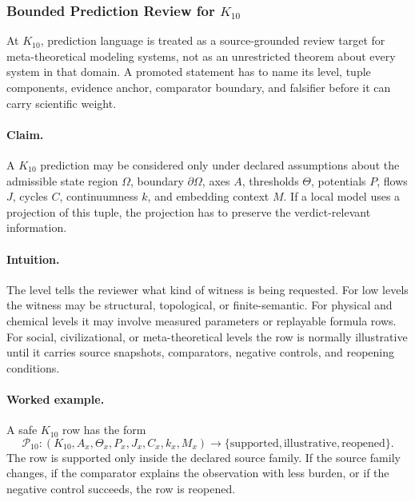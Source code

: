 \subsubsection{Bounded Prediction Review for \texorpdfstring{$K_10$}{K_10}}
\label{sec:predictions-k10-r014}

At \(K_10\), prediction language is treated as a source-grounded review
target for meta-theoretical modeling systems, not as an unrestricted theorem about every system in that
domain. A promoted statement has to name its level, tuple components, evidence
anchor, comparator boundary, and falsifier before it can carry scientific
weight.

\paragraph{Claim.}
A \(K_10\) prediction may be considered only under declared assumptions
about the admissible state region \(\Omega\), boundary \(\partial\Omega\), axes
\(A\), thresholds \(\Theta\), potentials \(P\), flows \(J\), cycles \(C\),
continuumness \(k\), and embedding context \(M\). If a local model uses a
projection of this tuple, the projection has to preserve the verdict-relevant
information.

\paragraph{Intuition.}
The level tells the reviewer what kind of witness is being requested. For low
levels the witness may be structural, topological, or finite-semantic. For
physical and chemical levels it may involve measured parameters or replayable
formula rows. For social, civilizational, or meta-theoretical levels the row is
normally illustrative until it carries source snapshots, comparators, negative
controls, and reopening conditions.

\paragraph{Worked example.}
A safe \(K_10\) row has the form
\[
  \mathcal{P}_{10}:
  (K_10, A_x, \Theta_x, P_x, J_x, C_x, k_x, M_x)
  \longrightarrow
  \{\mathrm{supported},\mathrm{illustrative},\mathrm{reopened}\}.
\]
The row is supported only inside the declared source family. If the source
family changes, if the comparator explains the observation with less burden, or
if the negative control succeeds, the row is reopened.

